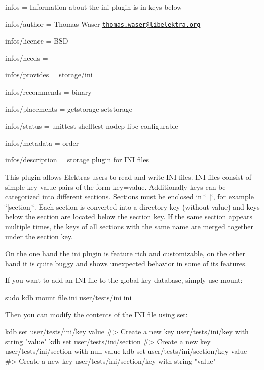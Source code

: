 
\begin{DoxyItemize}
\item infos = Information about the ini plugin is in keys below
\item infos/author = Thomas Waser \href{mailto:thomas.waser@libelektra.org}{\tt thomas.\+waser@libelektra.\+org}
\item infos/licence = B\+SD
\item infos/needs =
\item infos/provides = storage/ini
\item infos/recommends = binary
\item infos/placements = getstorage setstorage
\item infos/status = unittest shelltest nodep libc configurable
\item infos/metadata = order
\item infos/description = storage plugin for I\+NI files
\end{DoxyItemize}

This plugin allows Elektra\textquotesingle{}s users to read and write I\+NI files. I\+NI files consist of simple key value pairs of the form {\ttfamily key=value}. Additionally keys can be categorized into different sections. Sections must be enclosed in \char`\"{}\mbox{[}$\,$\mbox{]}\char`\"{}, for example \char`\"{}\mbox{[}section\mbox{]}\char`\"{}. Each section is converted into a directory key (without value) and keys below the section are located below the section key. If the same section appears multiple times, the keys of all sections with the same name are merged together under the section key.

On the one hand the ini plugin is feature rich and customizable, on the other hand it is quite buggy and shows unexpected behavior in some of its features.

If you want to add an I\+NI file to the global key database, simply use mount\+:


\begin{DoxyCode}
sudo kdb mount file.ini user/tests/ini ini
\end{DoxyCode}


Then you can modify the contents of the I\+NI file using set\+:


\begin{DoxyCode}
kdb set user/tests/ini/key value
#> Create a new key user/tests/ini/key with string "value"
kdb set user/tests/ini/section
#> Create a new key user/tests/ini/section with null value
kdb set user/tests/ini/section/key value
#> Create a new key user/tests/ini/section/key with string "value"
\end{DoxyCode}


